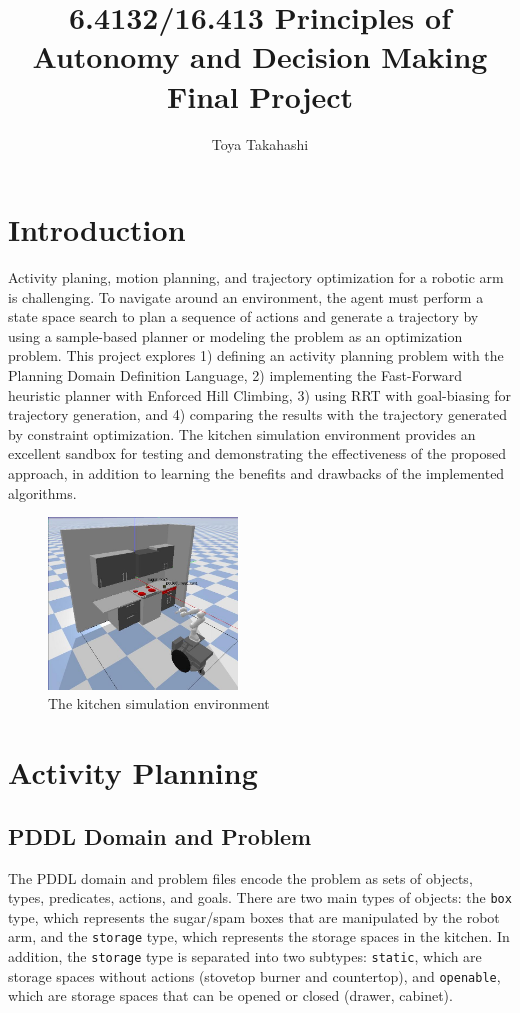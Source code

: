 \documentclass{article}
\title{6.4132/16.413 Principles of Autonomy and Decision Making Final Project}
\author[ ]{Toya Takahashi}
\affil[ ]{Massachusetts Institute of Technology}
\affil[ ]{Department of Aeronautics and Astronautics}
\begin{document}
\maketitle

\section{Introduction}

Activity planing, motion planning, and trajectory optimization for a robotic arm is challenging. To navigate around an environment, the agent must perform a state space search to plan a sequence of actions and generate a trajectory by using a sample-based planner or modeling the problem as an optimization problem. This project explores 1) defining an activity planning problem with the Planning Domain Definition Language, 2) implementing the Fast-Forward heuristic planner with Enforced Hill Climbing, 3) using RRT with goal-biasing for trajectory generation, and 4) comparing the results with the trajectory generated by constraint optimization. The kitchen simulation environment provides an excellent sandbox for testing and demonstrating the effectiveness of the proposed approach, in addition to learning the benefits and drawbacks of the implemented algorithms.

\begin{figure}[h]
    \centering
    \includegraphics[width=190px]{sim_env.jpg}
    \caption{The kitchen simulation environment}
    \label{fig:sim_env}
\end{figure}

\section{Activity Planning}

\subsection{PDDL Domain and Problem}

The PDDL domain and problem files encode the problem as sets of objects, types, predicates, actions, and goals. There are two main types of objects: the \texttt{box} type, which represents the sugar/spam boxes that are manipulated by the robot arm, and the \texttt{storage} type, which represents the storage spaces in the kitchen. In addition, the \texttt{storage} type is separated into two subtypes: \texttt{static}, which are storage spaces without actions (stovetop burner and countertop), and \texttt{openable}, which are storage spaces that can be opened or closed (drawer, cabinet).
\end{document}
